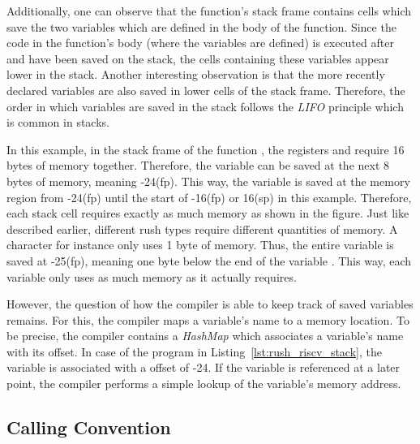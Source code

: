 Additionally, one can observe that the  function's
stack frame contains cells which save the two variables which are defined in the body of the function.
Since the code in the function's body (where the variables are defined) is executed after  and  have been saved on the stack,
the cells containing these variables appear lower in the stack.
Another interesting observation is that the more recently declared variables are also saved in lower cells of the stack frame.
Therefore, the order in which variables are saved in the stack follows the \emph{LIFO} principle which is common in stacks.

In this example, in the stack frame of the function , the registers  and  require 16 bytes of memory together.
Therefore, the variable  can be saved at the next 8 bytes of memory, meaning -24(fp).
This way, the variable is saved at the memory region from -24(fp) until the start of -16(fp) or 16(sp) in this example.
Therefore, each stack cell requires exactly as much memory as shown in the figure.
Just like described earlier, different rush types require different quantities of memory.
A character for instance only uses 1 byte of memory.
Thus, the entire variable  is saved at -25(fp), meaning one byte below the end of the variable .
This way, each variable only uses as much memory as it actually requires.

However, the question of how the compiler is able to keep track of saved variables remains.
For this, the compiler maps a variable's name to a memory location.
To be precise, the compiler contains a \emph{HashMap} which associates a variable's name with its  offset.
In case of the program in Listing~\ref{lst:rush_riscv_stack}, the variable  is associated with a  offset of -24.
If the variable is referenced at a later point, the compiler performs a simple lookup of the variable's memory address.

\subsection{Calling Convention}\label{sec:riscv_calling_conv}


